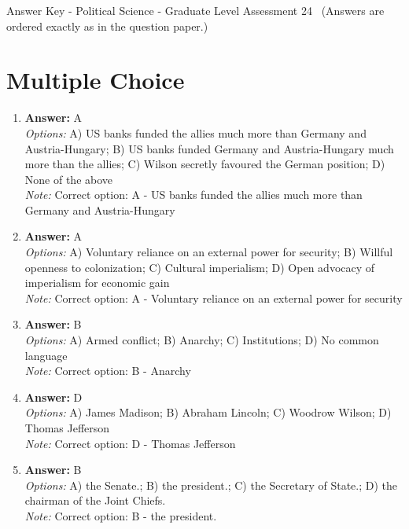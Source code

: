 \documentclass[12pt]{article}
\begin{document}
\begin{center}
Answer Key - Political Science - Graduate Level Assessment 24 \
\small (Answers are ordered exactly as in the question paper.)
\end{center}

\section*{Multiple Choice}
\begin{enumerate}[label=\arabic*.]
\item \textbf{Answer:} A
\\ \textit{Options:} A) US banks funded the allies much more than Germany and Austria-Hungary; B) US banks funded Germany and Austria-Hungary much more than the allies; C) Wilson secretly favoured the German position; D) None of the above
\\ \textit{Note:} Correct option: A - US banks funded the allies much more than Germany and Austria-Hungary
\item \textbf{Answer:} A
\\ \textit{Options:} A) Voluntary reliance on an external power for security; B) Willful openness to colonization; C) Cultural imperialism; D) Open advocacy of imperialism for economic gain
\\ \textit{Note:} Correct option: A - Voluntary reliance on an external power for security
\item \textbf{Answer:} B
\\ \textit{Options:} A) Armed conflict; B) Anarchy; C) Institutions; D) No common language
\\ \textit{Note:} Correct option: B - Anarchy
\item \textbf{Answer:} D
\\ \textit{Options:} A) James Madison; B) Abraham Lincoln; C) Woodrow Wilson; D) Thomas Jefferson
\\ \textit{Note:} Correct option: D - Thomas Jefferson
\item \textbf{Answer:} B
\\ \textit{Options:} A) the Senate.; B) the president.; C) the Secretary of State.; D) the chairman of the Joint Chiefs.
\\ \textit{Note:} Correct option: B - the president.
\end{enumerate}
\end{document}

